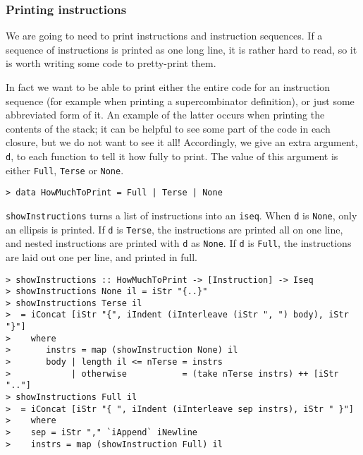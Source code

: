 \subsubsection{Printing instructions}

We are going to need to print instructions and instruction sequences.
If a sequence of instructions is printed as one long line, it is
rather hard to read, so it is worth writing some code to pretty-print
them.

In fact we want to be able to print either the entire
code for an instruction sequence (for example when printing a supercombinator
definition), or just some abbreviated form of it.
An example of the latter occurs when printing the contents of the stack;
it can be helpful to see some part of the code in each closure, but we do not
want to see it all!  Accordingly, we give an extra argument, \mbox{\tt d}, to each
function to tell it how fully to print.
The value of this argument is either
\mbox{\tt Full}, \mbox{\tt Terse} or \mbox{\tt None}.
\begin{verbatim}
> data HowMuchToPrint = Full | Terse | None
\end{verbatim}
%
%
%
\par
\mbox{\tt showInstructions} turns a list of instructions into an \mbox{\tt iseq}.
When \mbox{\tt d} is \mbox{\tt None}, only an ellipsis is printed.
If \mbox{\tt d} is \mbox{\tt Terse}, the instructions are printed all on one line, and
nested instructions are printed with \mbox{\tt d} as \mbox{\tt None}.
If \mbox{\tt d} is \mbox{\tt Full}, the instructions are laid out one per line, and printed
in full.
\begin{verbatim}
> showInstructions :: HowMuchToPrint -> [Instruction] -> Iseq
> showInstructions None il = iStr "{..}"
> showInstructions Terse il
>  = iConcat [iStr "{", iIndent (iInterleave (iStr ", ") body), iStr "}"]
>    where
>       instrs = map (showInstruction None) il
>       body | length il <= nTerse = instrs
>            | otherwise           = (take nTerse instrs) ++ [iStr ".."]
> showInstructions Full il
>  = iConcat [iStr "{ ", iIndent (iInterleave sep instrs), iStr " }"]
>    where
>    sep = iStr "," `iAppend` iNewline
>    instrs = map (showInstruction Full) il
\end{verbatim}
%
%
%
